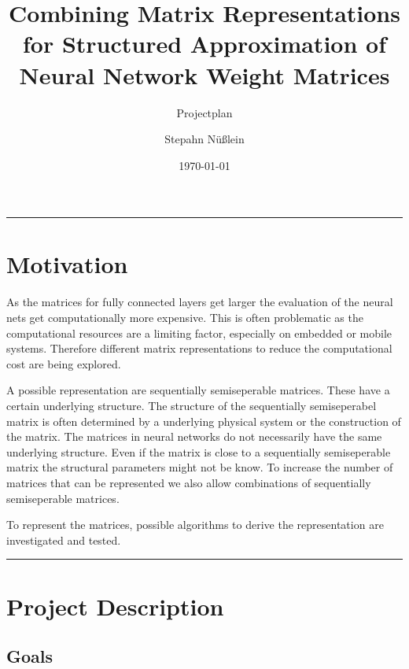 \documentclass[lang=ngerman,inputenc=utf8,fontsize=10pt]{ldvarticle}
\title{Combining Matrix Representations for Structured Approximation of Neural Network Weight Matrices}
\subtitle{Projectplan}
\author{Stepahn Nüßlein}
\date{\today}
\begin{document}
	\maketitle
	\thispagestyle{empty}
	\vspace*{2cm}
	\hrule

\section*{Motivation}

As the matrices for fully connected layers get larger the evaluation of the neural nets get computationally more expensive. This is often problematic as the computational resources are a limiting factor, especially on embedded or mobile systems.
Therefore different matrix representations to reduce the computational cost are being explored.

A possible representation are sequentially semiseperable matrices. These have a certain underlying structure.
The structure of the sequentially semiseperabel matrix is often determined by a underlying physical system or the construction of the matrix.
The matrices in neural networks do not necessarily have the same underlying structure.
Even if the matrix is close to a sequentially semiseperable matrix the structural parameters might not be know.
To increase the number of matrices that can be represented we also allow combinations of sequentially semiseperable matrices.

To represent the matrices, possible algorithms to derive the representation are investigated and tested.




\vspace*{1cm}
\hrule

\newpage

\section{Project Description}

\subsection*{Goals}
\end{document}
